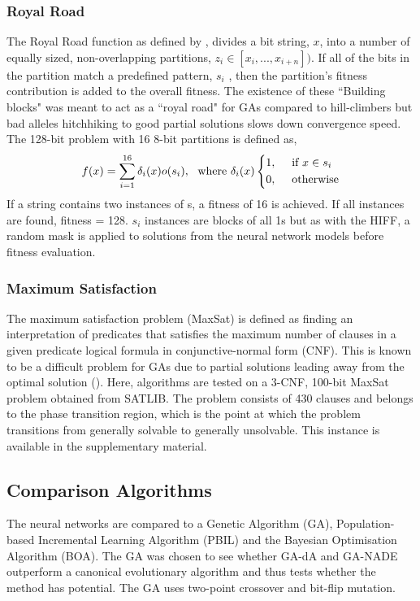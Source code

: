\documentclass[twoside]{article}
\begin{document}
\subsubsection{Royal Road}
The Royal Road function as defined by \cite{mitchell1992royal}, divides a bit string, \(x\), into a number of equally sized, non-overlapping partitions, \(z_i\in[x_i, ..., x_{i+n}])\). If all of the bits in the partition match a predefined pattern, \(s_i\) , then the partition's fitness contribution is added to the overall fitness. The existence of these ``Building blocks" was meant to act as a ``royal road" for GAs compared to hill-climbers but bad alleles hitchhiking to good partial solutions slows down convergence speed. The 128-bit problem with 16 8-bit partitions is defined as,
\\
\[
f(x)= \sum_{i=1}^{16} \delta_i(x)o(s_i), \text{\ \ where\ } \delta_i(x) \begin{dcases*}
1, \text{\ \ \ \ if } x\in s_i\\
0, \text{\ \ \ \ otherwise}
\end{dcases*}
\]
If a string contains two instances of s, a fitness of 16 is achieved. If all instances are found, fitness = 128. \(s_i\) instances are blocks of all 1s but as with the HIFF, a random mask is applied to solutions from the neural network models before fitness evaluation.
\subsubsection{Maximum Satisfaction}
The maximum satisfaction problem (MaxSat) is defined as finding an interpretation of predicates that satisfies the maximum number of clauses in a given predicate logical formula in conjunctive-normal form (CNF). This is known to be a difficult problem for GAs due to partial solutions leading away from the optimal solution (\cite{rana1998genetic,pelikan2003hierarchical}). Here, algorithms are tested on a 3-CNF, 100-bit MaxSat problem obtained from SATLIB. The problem consists of 430
clauses and belongs to the phase transition region, which is the point at which
the problem transitions from generally solvable to generally unsolvable. This instance is available in the supplementary material.
\subsection{Comparison Algorithms}
\label{sec:comparisons}
The neural networks are compared to a Genetic Algorithm (GA), Population-based Incremental Learning Algorithm (PBIL) and the Bayesian Optimisation Algorithm (BOA). The GA was chosen to see whether GA-dA and GA-NADE outperform a canonical evolutionary algorithm and thus tests whether the method has potential. The GA uses two-point crossover and bit-flip mutation.
\end{document}
